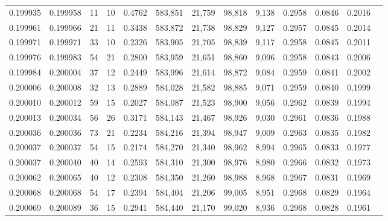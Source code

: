 \begin{tabular}{rrrrrrrrrrrrr}
0.199935 & 0.199958 &    11 &  10 &                                     0.4762 & 583,851 &  21,759 &  98,818 &   9,138 & 0.2958 & 0.0846 & 0.2016 \\
0.199961 & 0.199966 &    21 &  11 &                                     0.3438 & 583,872 &  21,738 &  98,829 &   9,127 & 0.2957 & 0.0845 & 0.2014 \\
0.199971 & 0.199971 &    33 &  10 &                                     0.2326 & 583,905 &  21,705 &  98,839 &   9,117 & 0.2958 & 0.0845 & 0.2011 \\
0.199976 & 0.199983 &    54 &  21 &                                     0.2800 & 583,959 &  21,651 &  98,860 &   9,096 & 0.2958 & 0.0843 & 0.2006 \\
0.199984 & 0.200004 &    37 &  12 &                                     0.2449 & 583,996 &  21,614 &  98,872 &   9,084 & 0.2959 & 0.0841 & 0.2002 \\
0.200006 & 0.200008 &    32 &  13 &                                     0.2889 & 584,028 &  21,582 &  98,885 &   9,071 & 0.2959 & 0.0840 & 0.1999 \\
0.200010 & 0.200012 &    59 &  15 &                                     0.2027 & 584,087 &  21,523 &  98,900 &   9,056 & 0.2962 & 0.0839 & 0.1994 \\
0.200013 & 0.200034 &    56 &  26 &                                     0.3171 & 584,143 &  21,467 &  98,926 &   9,030 & 0.2961 & 0.0836 & 0.1988 \\
0.200036 & 0.200036 &    73 &  21 &                                     0.2234 & 584,216 &  21,394 &  98,947 &   9,009 & 0.2963 & 0.0835 & 0.1982 \\
0.200037 & 0.200037 &    54 &  15 &                                     0.2174 & 584,270 &  21,340 &  98,962 &   8,994 & 0.2965 & 0.0833 & 0.1977 \\
0.200037 & 0.200040 &    40 &  14 &                                     0.2593 & 584,310 &  21,300 &  98,976 &   8,980 & 0.2966 & 0.0832 & 0.1973 \\
0.200062 & 0.200065 &    40 &  12 &                                     0.2308 & 584,350 &  21,260 &  98,988 &   8,968 & 0.2967 & 0.0831 & 0.1969 \\
0.200068 & 0.200068 &    54 &  17 &                                     0.2394 & 584,404 &  21,206 &  99,005 &   8,951 & 0.2968 & 0.0829 & 0.1964 \\
0.200069 & 0.200089 &    36 &  15 &                                     0.2941 & 584,440 &  21,170 &  99,020 &   8,936 & 0.2968 & 0.0828 & 0.1961 \\

\end{tabular}
